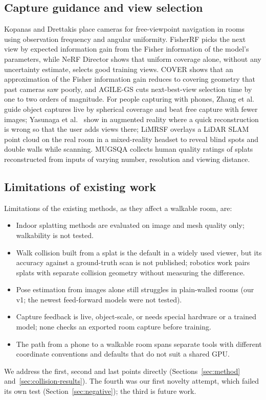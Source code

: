 \subsection{Capture guidance and view selection}
Kopanas and Drettakis \cite{kopanas2023placement} place cameras for free-viewpoint navigation in rooms using observation frequency and angular uniformity. FisherRF \cite{jiang2024fisherrf} picks the next view by expected information gain from the Fisher information of the model's parameters, while NeRF Director \cite{xiao2024nerfdirector} shows that uniform coverage alone, without any uncertainty estimate, selects good training views. COVER \cite{chen2026cover} shows that an approximation of the Fisher information gain reduces to covering geometry that past cameras saw poorly, and AGILE-GS \cite{khass2026agilegs} cuts next-best-view selection time by one to two orders of magnitude. For people capturing with phones, Zhang et al.\ \cite{zhang2026objectcentered} guide object captures live by spherical coverage and beat free capture with fewer images; Yasunaga et al.\ \cite{yasunaga2025userloop} show in augmented reality where a quick reconstruction is wrong so that the user adds views there; LiMRSF \cite{chang2026limrsf} overlays a LiDAR SLAM point cloud on the real room in a mixed-reality headset to reveal blind spots and double walls while scanning. MUGSQA \cite{chen2026mugsqa} collects human quality ratings of splats reconstructed from inputs of varying number, resolution and viewing distance.

\subsection{Limitations of existing work}
Limitations of the existing methods, as they affect a walkable room, are:
\begin{itemize}
    \item Indoor splatting methods are evaluated on image and mesh quality only; walkability is not tested.
    \item Walk collision built from a splat is the default in a widely used viewer, but its accuracy against a ground-truth scan is not published; robotics work pairs splats with separate collision geometry without measuring the difference.
    \item Pose estimation from images alone still struggles in plain-walled rooms (our v1; the newest feed-forward models were not tested).
    \item Capture feedback is live, object-scale, or needs special hardware or a trained model; none checks an exported room capture before training.
    \item The path from a phone to a walkable room spans separate tools with different coordinate conventions and defaults that do not suit a shared GPU.
\end{itemize}
We address the first, second and last points directly (Sections~\ref{sec:method} and~\ref{sec:collision-results}). The fourth was our first novelty attempt, which failed its own test (Section~\ref{sec:negative}); the third is future work.
